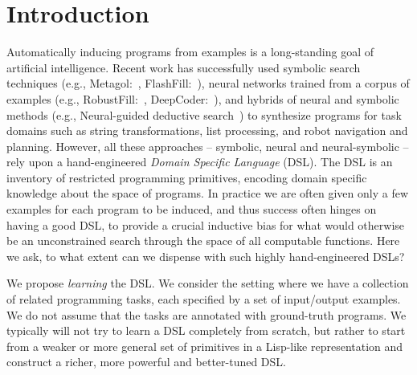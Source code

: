\documentclass{article}
\newcommand{\system}{\textsc{DreamCoder}~}
\begin{document}
\printAffiliationsAndNotice{\icmlEqualContribution} %

\begin{abstract}
  Successful approaches to program induction require a
  hand-engineered domain-specific language (DSL),
  constraining the space of allowed programs and imparting
  prior knowledge of the domain.
  We contribute a program learning algorithm
  called \system
  that infers a DSL
  and trains a neural network to
  efficiently search for programs in the learned DSL.
  We use our model to build circuits,
  edit strings, do symbolic regression,
  and synthesize functions on lists,
  in each case showing that
  \system learns a domain-specific vocabulary for expressing solutions to the problems in the domain.
  
  
  
  
  

\end{abstract}

\section{Introduction}

Automatically inducing programs from examples is a long-standing goal
of artificial intelligence. Recent work has successfully used
symbolic search techniques (e.g., Metagol:~\cite{muggleton2015meta},
FlashFill:~\cite{gulwani2011automating}), neural networks trained from
a corpus of examples (e.g., RobustFill:~\cite{devlin2017robustfill},
DeepCoder:~\cite{balog2016deepcoder}), and hybrids of neural and
symbolic methods (e.g., Neural-guided deductive search~\cite{ngds}) to
synthesize programs for task domains such as string transformations,
list processing, and robot navigation and planning. However, all these
approaches -- symbolic, neural and neural-symbolic -- rely upon a
hand-engineered \emph{Domain Specific Language} (DSL). The DSL is an
inventory of restricted programming primitives, encoding domain
specific knowledge about the space of programs. In
practice
we are often given only a few examples for each
program to be induced, and thus success often hinges on having a good
DSL, to
provide a crucial inductive bias for what would otherwise be an
unconstrained search through the space of all computable functions.
Here we ask, to what extent can we dispense with such highly
hand-engineered DSLs?

We propose \emph{learning} the DSL. We consider the setting where we
have a collection of related programming tasks, each specified by a
set of input/output examples. We do not assume that the tasks are
annotated with ground-truth programs. We typically will not try to
learn a DSL completely from scratch, but rather to start from a weaker
or more general set of primitives in a Lisp-like representation and
construct a richer, more powerful and better-tuned DSL.
\end{document}
